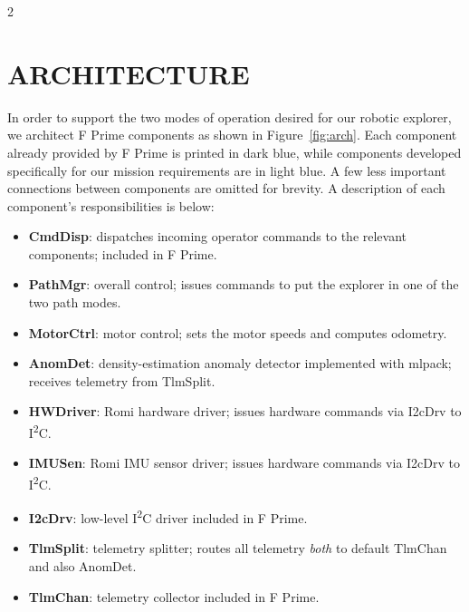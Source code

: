 \documentclass[10pt, fleqn]{article}
\begin{document}
\begin{multicols*}{2}
  



\section{ARCHITECTURE}

In order to support the two modes of operation desired for our robotic explorer,
we architect F Prime components as shown in Figure~\ref{fig:arch}.
Each component already provided by F Prime is printed in dark blue,
while components developed specifically for our mission requirements are in light blue.
A few less important connections between components are omitted for brevity.
A description of each component's responsibilities is below:

\begin{itemize}
  \item {\bf CmdDisp}: dispatches incoming operator commands to the relevant components; included in F Prime.
  \item {\bf PathMgr}: overall control; issues commands to put the explorer in one of the two path modes.
  \item {\bf MotorCtrl}: motor control; sets the motor speeds and computes odometry.  \item {\bf AnomDet}: density-estimation anomaly detector implemented with mlpack; receives telemetry from TlmSplit.
  \item {\bf HWDriver}: Romi hardware driver; issues hardware commands via I2cDrv to I\textsuperscript{2}C.
  \item {\bf IMUSen}: Romi IMU sensor driver; issues hardware commands via I2cDrv to I\textsuperscript{2}C.
  \item {\bf I2cDrv}: low-level I\textsuperscript{2}C driver included in F Prime.
  \item {\bf TlmSplit}: telemetry splitter; routes all telemetry {\em both} to default TlmChan and also AnomDet.
  \item {\bf TlmChan}: telemetry collector included in F Prime.
\end{itemize}


\end{multicols*}
\end{document}
